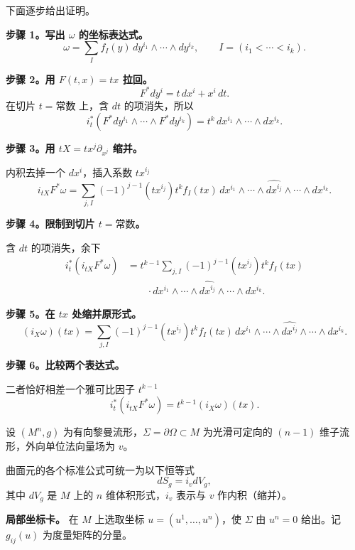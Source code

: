 下面逐步给出证明。

\noindent\textbf{步骤 1。写出 $\omega$ 的坐标表达式。}
\[
  \omega=\sum_I f_I(y)\,dy^{i_1}\wedge\cdots\wedge dy^{i_k},
  \qquad I=(i_1<\cdots<i_k).
\]

\noindent\textbf{步骤 2。用 $F(t,x)=tx$ 拉回。}
\[
  F^*dy^i=t\,dx^i+x^i\,dt.
\]
在切片 $t=\text{常数}$ 上，含 $dt$ 的项消失，所以
\[
  i_t^*(F^*dy^{i_1}\wedge\cdots\wedge F^*dy^{i_k})
   =t^k\,dx^{i_1}\wedge\cdots\wedge dx^{i_k}.
\]

\noindent\textbf{步骤 3。用 $tX=tx^j\partial_{x^j}$ 缩并。}\par
内积去掉一个 $dx^i$，插入系数 $tx^{i_j}$
\[
  i_{tX}F^*\omega
   =\sum_{j,I}(-1)^{j-1}(tx^{i_j})t^k f_I(tx)\,
     dx^{i_1}\wedge\cdots\wedge\widehat{dx^{i_j}}\wedge\cdots\wedge dx^{i_k}.
\]

\noindent\textbf{步骤 4。限制到切片 $t=\text{常数}$。}\par
含 $dt$ 的项消失，余下
\begin{align*}
  i_t^*(i_{tX}F^*\omega)
   &=t^{k-1}\sum_{j,I}(-1)^{j-1}(tx^{i_j})t^k f_I(tx)\\
   &\qquad{}\cdot dx^{i_1}\wedge\cdots\wedge\widehat{dx^{i_j}}\wedge\cdots\wedge dx^{i_k}.
\end{align*}

\noindent\textbf{步骤 5。在 $tx$ 处缩并原形式。}
\[
  (i_X\omega)(tx)=\sum_{j,I}(-1)^{j-1}(tx^{i_j})t^k f_I(tx)\,
     dx^{i_1}\wedge\cdots\wedge\widehat{dx^{i_j}}\wedge\cdots\wedge dx^{i_k}.
\]

\noindent\textbf{步骤 6。比较两个表达式。}\par
二者恰好相差一个雅可比因子 $t^{k-1}$%
%
\[
  i_t^*(i_{tX}F^*\omega)=t^{k-1}(i_X\omega)(tx).
\]

设 $(M^n,g)$ 为有向黎曼流形，$\Sigma=\partial\Omega\subset M$ 为光滑可定向的 $(n-1)$ 维子流形，外向单位法向量场为 $v$。

曲面元的各个标准公式可统一为以下恒等式
\[
  dS_g=i_vdV_g,
\]
其中 $dV_g$ 是 $M$ 上的 $n$ 维体积形式，$i_v$ 表示与 $v$ 作内积（缩并）。

\noindent\textbf{局部坐标卡。} 在 $M$ 上选取坐标 $u=(u^1,\dots,u^n)$，使 $\Sigma$ 由 $u^n=0$ 给出。记 $g_{ij}(u)$ 为度量矩阵的分量。

